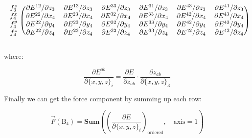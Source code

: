 \documentclass{article}
\begin{document}
\begin{eqnarray}
\begin{blockarray}{ccccccc}
\begin{block}{c(cccccc)}
f^z_3 &
\partial{E^{12}} / \partial{z_3} & \partial{E^{13}} / \partial{z_3} &
\partial{E^{33}} / \partial{z_3} & \partial{E^{31}} / \partial{z_3} &
\partial{E^{43}} / \partial{z_3} & \partial{E^{41}} / \partial{z_3} \\
%
f^x_4 &
\partial{E^{22}} / \partial{x_4} & \partial{E^{23}} / \partial{x_4} &
\partial{E^{32}} / \partial{x_4} & \partial{E^{33}} / \partial{x_4} &
\partial{E^{42}} / \partial{x_4} & \partial{E^{43}} / \partial{x_4} \\
f^y_4 &
\partial{E^{22}} / \partial{y_4} & \partial{E^{23}} / \partial{y_4} &
\partial{E^{32}} / \partial{y_4} & \partial{E^{33}} / \partial{y_4} &
\partial{E^{42}} / \partial{y_4} & \partial{E^{43}} / \partial{y_4} \\
f^z_4 &
\partial{E^{22}} / \partial{z_4} & \partial{E^{23}} / \partial{z_4} &
\partial{E^{32}} / \partial{z_4} & \partial{E^{33}} / \partial{z_4} &
\partial{E^{42}} / \partial{z_4} & \partial{E^{43}} / \partial{z_4} \\
\end{block}
\end{blockarray}
\end{eqnarray}

\noindent where:

\begin{equation}
\frac{\partial{E^{ab}}}{\partial{\{x, y, z\}_i}} = 
\frac{\partial{E}}{\partial{z_{ab}}}
\cdot
\frac{\partial{z_{ab}}}{\partial{\{x, y, z\}_3}}
\end{equation}

\noindent Finally we can get the force component by summing up each row:

\begin{equation}
\vec{F}(\mathrm{B}_{4}) = 
\mathbf{Sum}\left(
\left(
	\frac{\partial{E}}{\partial{\{x, y, z\}_i}}
\right)_{\mathrm{ordered}}, \quad \mathrm{axis}=1
\right)
\end{equation}
\end{document}
